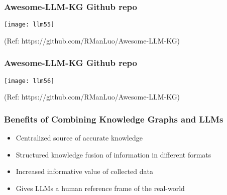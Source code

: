 \begin{frame}[fragile]\frametitle{Awesome-LLM-KG Github repo}

\begin{center}
\texttt{[image: llm55]}
\end{center}	

{\tiny (Ref: https://github.com/RManLuo/Awesome-LLM-KG)}

	
\end{frame}

\begin{frame}[fragile]\frametitle{Awesome-LLM-KG Github repo}

\begin{center}
\texttt{[image: llm56]}
\end{center}	

{\tiny (Ref: https://github.com/RManLuo/Awesome-LLM-KG)}

	
\end{frame}



\begin{frame}[fragile]\frametitle{Benefits of Combining Knowledge Graphs and LLMs}

\begin{itemize}
\item Centralized source of accurate knowledge
\item Structured knowledge fusion of information in different formats
\item Increased informative value of collected data
\item Gives LLMs a human reference frame of the real-world
\end{itemize}

\end{frame}

